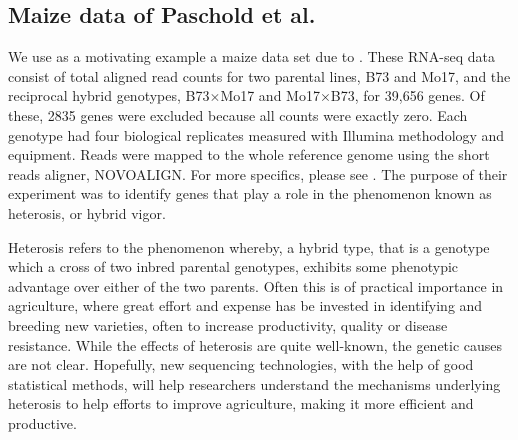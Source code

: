 \begin{table}[ht]
\centering
\begin{minipage}{.8\textwidth}
\caption{\small Selected rows from RNA-seq data set showing total aligned read counts for selected genes. Columns are grouped by genotype. Genes were selected as exemplars for different types of heterosis.}
\label{counts}
\end{minipage}
\end{table}
% 
\subsection{Maize data of Paschold et al.}
\label{intro-paschold}
We use as a motivating example a maize data set due to \citep{paschold}. These RNA-seq data consist of total aligned read counts for two parental lines, B73 and Mo17, and the reciprocal hybrid genotypes, B73$\times$Mo17 and Mo17$\times$B73, for 39,656 genes. Of these, 2835 genes were excluded because all counts were exactly zero. Each genotype had four biological replicates measured with Illumina methodology and equipment. Reads were mapped to the whole reference genome using the short reads aligner, NOVOALIGN. For more specifics, please see \cite{paschold}. The purpose of their experiment was to identify genes that play a role in the phenomenon known as heterosis, or hybrid vigor.

Heterosis refers to the phenomenon whereby, a hybrid type, that is a genotype which a cross of two inbred parental genotypes, exhibits some phenotypic advantage over either of the two parents. Often this is of practical importance in agriculture, where great effort and expense has be invested in identifying and breeding new varieties, often to increase productivity, quality or disease resistance. While the effects of heterosis are quite well-known, the genetic causes are not clear. Hopefully, new sequencing technologies, with the help of good statistical methods, will help researchers understand the mechanisms underlying heterosis to help efforts to improve agriculture, making it more efficient and productive.


